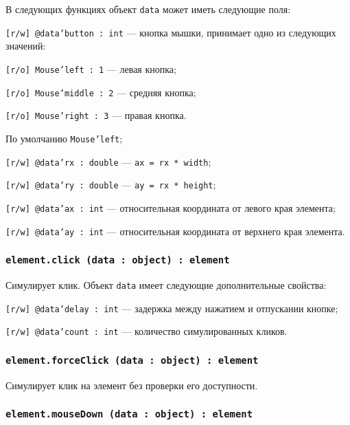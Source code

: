В следующих функциях объект \texttt{data} может иметь следующие поля:
\begin{icItems}
	\item \texttt{[r/w] @data'button : int} — кнопка мышки, принимает одно из следующих значений:
	\begin{icItems}
		\item \texttt{[r/o] Mouse'left : 1} — левая кнопка;
		\item \texttt{[r/o] Mouse'middle : 2} — средняя кнопка;
		\item \texttt{[r/o] Mouse'right : 3} — правая кнопка.
	\end{icItems}
	По умолчанию \texttt{Mouse'left};
	\item \texttt{[r/w] @data'rx : double} — \texttt{ax = rx * width};
	\item \texttt{[r/w] @data'ry : double} — \texttt{ay = rx * height};
	\item \texttt{[r/w] @data'ax : int} — относительная координата от левого края элемента;
	\item \texttt{[r/w] @data'ay : int} — относительная координата от верхнего края элемента.
\end{icItems}

\subsubsection{\texttt{element.click (data : object) : element}}

Симулирует клик. Объект \texttt{data} имеет следующие дополнительные свойства:
\begin{icItems}
	\item \texttt{[r/w] @data'delay : int} — задержка между нажатием и отпускании кнопке;
	\item \texttt{[r/w] @data'count : int} — количество симулированных кликов.
\end{icItems}

\subsubsection{\texttt{element.forceClick (data : object) : element}}

Симулирует клик на элемент без проверки его доступности.

\subsubsection{\texttt{element.mouseDown (data : object) : element}}

